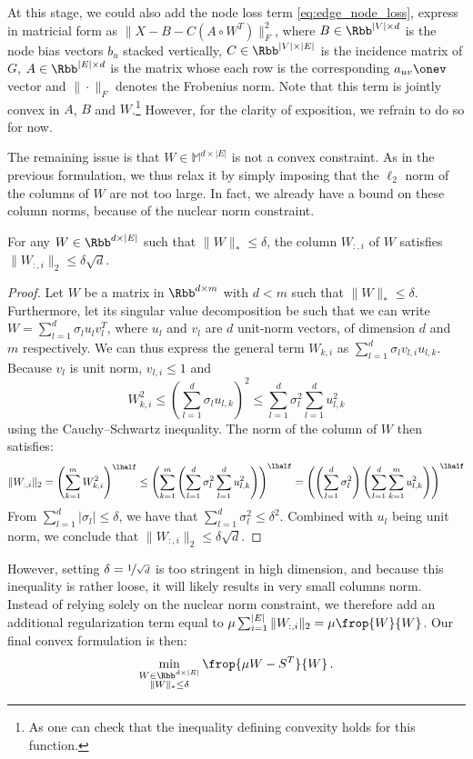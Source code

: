 At this stage, we could also add the node loss term \eqref{eq:edge_node_loss}, express in matricial
form as $\|X - B -
C\left(A\circ W^T \right)\|_F^2$, where $B\in \Rbb^{|V| \times d}$ is the node bias vectors $b_u$
stacked vertically, $C \in \Rbb^{|V| \times |E|}$ is the incidence matrix of $G$, $A \in \Rbb^{|E|
\times d}$ is the matrix whose each row is the corresponding $a_{uv}\onev$ vector and $\|\cdot\|_F$
denotes the Frobenius norm. Note that this term is jointly convex in $A$, $B$ and $W$.\footnote{As
one can check that the inequality defining convexity holds for this function.} However, for the
clarity of exposition, we refrain to do so for now.

The remaining issue is that $W\in \mathbb{M}^{d\times |E|}$ is not a convex constraint. As in the
previous formulation, we thus relax it by simply imposing that the $\ell_2$ norm of the columns of
$W$ are not too large. In fact, we already have a bound on these column norms, because of the
nuclear norm constraint.
\begin{prop}
For any $W\in \Rbb^{d\times |E|}$ such that $\|W\|_* \leq \delta$, the \ith{} column $W_{:,i}$ of
$W$ satisfies $\|W_{:,i}\|_2 \leq \delta\sqrt{d}$.
\end{prop}
\begin{proof}
  Let $W$ be a matrix in $\Rbb^{d\times m}$ with $d < m$ such that $\|W\|_* \leq \delta$.
  Furthermore, let its singular value decomposition be such that we can write $W = \sum_{l=1}^d
  \sigma_l u_l v_l^T$, where $u_l$ and $v_l$ are $d$ unit-norm vectors, of dimension $d$ and $m$
  respectively. We can thus express the general term $W_{k,i}$ as $\sum_{l=1}^d \sigma_l v_{l,i}
  u_{l,k}$. Because $v_l$ is unit norm, $v_{l,i} \leq 1$ and $$W_{k,i}^2 \leq \left( \sum_{l=1}^d
  \sigma_l u_{l,k} \right)^2 \leq \sum_{l=1}^d \sigma_l^2 \sum_{l=1}^d u_{l,k}^2$$ using the
  Cauchy--Schwartz inequality. The norm of the \ith{} column of $W$ then satisfies:
  \begin{equation*}
    \|W_{:,i}\|_2 = \left( \sum_{k=1}^m W_{k,i}^2 \right)^\lhalf
    \leq \left( \sum_{k=1}^m \left( \sum_{l=1}^d \sigma_l^2 \sum_{l=1}^d u_{l,k}^2 \right) \right)^\lhalf
    = \left( \left( \sum_{l=1}^d \sigma_l^2 \right) \left( \sum_{l=1}^d \sum_{k=1}^m u_{l,k}^2 \right) \right)^\lhalf
  \end{equation*}
  From $\sum_{l=1}^d |\sigma_l | \leq \delta$, we have that $\sum_{l=1}^d \sigma_l^2 \leq \delta^2$.
  Combined with $u_l$ being unit norm, we conclude that $\|W_{:,i}\|_2 \leq \delta\sqrt{d}$.
\end{proof}
However, setting $\delta = \nicefrac{1}{\sqrt{d}}$ is too stringent in high dimension, and because
this inequality is rather loose, it will likely results in very small columns norm. Instead of
relying solely on the nuclear norm constraint, we therefore add an additional regularization term
equal to $\mu \sum_{i=1}^{|E|} \|W_{:,i}\|_2 = \mu \frop{W}{W}$. Our final convex formulation is
then:
\begin{equation}
  \label{eq:edge_FW}
  \min_{\substack{W\in \Rbb^{d\times |E|} \\ \|W\|_* \leq \delta}} \frop{\mu W - S^T}{W} \,.
\end{equation}

